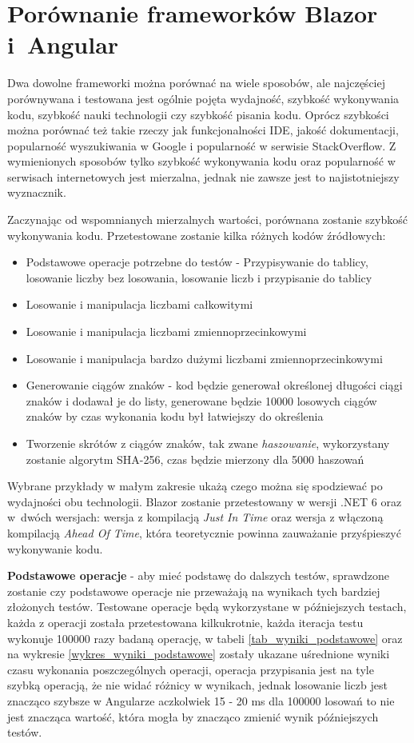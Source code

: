 \documentclass[12pt,a4paper,oneside]{book}
\begin{document}
\chapter{Porównanie frameworków Blazor i~Angular}\label{ch_3}

Dwa dowolne frameworki można porównać na wiele sposobów, ale najczęściej porównywana i testowana jest ogólnie pojęta wydajność, szybkość wykonywania kodu, szybkość nauki technologii czy szybkość pisania kodu. Oprócz szybkości można porównać też takie rzeczy jak funkcjonalności IDE, jakość dokumentacji, popularność wyszukiwania w Google i popularność w serwisie StackOverflow. Z wymienionych sposobów tylko szybkość wykonywania kodu oraz popularność w serwisach internetowych jest mierzalna, jednak nie zawsze jest to najistotniejszy wyznacznik.

Zaczynając od wspomnianych mierzalnych wartości, porównana zostanie szybkość wykonywania kodu. Przetestowane zostanie kilka różnych kodów źródłowych:

\begin{itemize}
  \item Podstawowe operacje potrzebne do testów - Przypisywanie do tablicy, losowanie liczby bez losowania, losowanie liczb i przypisanie do tablicy
  \item Losowanie i manipulacja liczbami całkowitymi
  \item Losowanie i manipulacja liczbami zmiennoprzecinkowymi
  \item Losowanie i manipulacja bardzo dużymi liczbami zmiennoprzecinkowymi
  \item Generowanie ciągów znaków - kod będzie generował określonej długości ciągi znaków i dodawał je do listy, generowane będzie 10000 losowych ciągów znaków by czas wykonania kodu był łatwiejszy do określenia
  \item Tworzenie skrótów z ciągów znaków, tak zwane \textit{haszowanie}, wykorzystany zostanie algorytm SHA-256, czas będzie mierzony dla 5000 haszowań
\end{itemize}

Wybrane przykłady w małym zakresie ukażą czego można się spodziewać po wydajności obu technologii. Blazor zostanie przetestowany w wersji .NET 6 oraz w~dwóch wersjach: wersja z kompilacją \textit{Just In Time} oraz wersja z włączoną kompilacją \textit{Ahead Of Time}, która teoretycznie powinna zauważanie przyśpieszyć wykonywanie kodu.

\textbf{Podstawowe operacje} - aby mieć podstawę do dalszych testów, sprawdzone zostanie czy podstawowe operacje nie przeważają na wynikach tych bardziej złożonych testów. Testowane operacje będą wykorzystane w późniejszych testach, każda z operacji została przetestowana kilkukrotnie, każda iteracja testu wykonuje 100000 razy badaną operację, w tabeli \ref{tab_wyniki_podstawowe} oraz na wykresie \ref{wykres_wyniki_podstawowe} zostały ukazane uśrednione wyniki czasu wykonania poszczególnych operacji, operacja przypisania jest na tyle szybką operacją, że nie widać różnicy w wynikach, jednak losowanie liczb jest znacząco szybsze w Angularze aczkolwiek 15 - 20 ms dla 100000 losowań to nie jest znacząca wartość, która mogła by znacząco zmienić wynik późniejszych testów.
\end{document}
